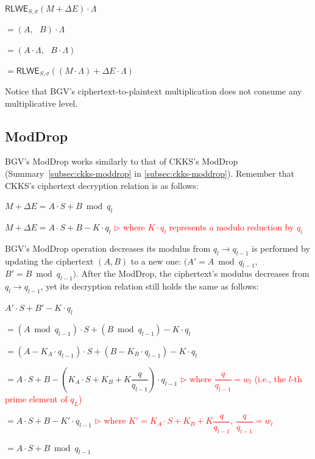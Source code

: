 \begin{tcolorbox}[title={\textbf{\tboxlabel{\ref*{subsec:bgv-mult-plain}} BGV Ciphertext-to-Plaintext Multiplication}}]
$\textsf{RLWE}_{S, \sigma}(M + \Delta E) \cdot \Lambda$

$= (A, \text{ } B) \cdot \Lambda$

$= (A \cdot \Lambda, \text{ }  B \cdot \Lambda )$

$= \textsf{RLWE}_{S, \sigma}((M \cdot \Lambda) + \Delta E\cdot \Lambda )$
\end{tcolorbox}

Notice that BGV's ciphertext-to-plaintext multiplication does not consume any multiplicative level. 

\subsection{\textsf{ModDrop}}
\label{subsec:bgv-moddrop}

BGV's \textsf{ModDrop} works similarly to that of CKKS's \textsf{ModDrop} (Summary~\ref*{subsec:ckks-moddrop} in \autoref{subsec:ckks-moddrop}). Remember that CKKS's ciphertext decryption relation is as follows:

$M + \Delta E = A \cdot S + B \bmod q_l$

$M + \Delta E = A \cdot S + B - K\cdot q_l$ \textcolor{red}{ $\rhd$ where $K\cdot q_l$ represents a modulo reduction by $q_l$}

BGV's \textsf{ModDrop} operation decreases its modulus from $q_l \rightarrow q_{l-1}$ is performed by updating the ciphertext $(A, B)$ to a new one: $\bm(A' = A \bmod q_{l-1}$, $B' = B \bmod q_{l-1})$. After the \textsf{ModDrop}, the ciphertext's modulus decreases from $q_l \rightarrow q_{l-1}$, yet its decryption relation still holds the same as follows:

$A' \cdot S + B' - K\cdot q_l $

$= (A \bmod q_{l-1}) \cdot S + (B \bmod q_{l-1}) - K\cdot q_l$

$= (A - K_A\cdot q_{l-1}) \cdot S + (B - K_B\cdot q_{l-1}) - K\cdot q_l$ 

$= A\cdot S + B - (K_A \cdot S + K_B + K\dfrac{q}{q_{l-1}})\cdot q_{l-1}$
\textcolor{red}{ $\rhd$ where $\dfrac{q}{q_{l-1}} = w_l$ (i.e., the $l$-th prime element of $q_L$)}

$= A\cdot S + B - K'\cdot q_{l-1}$ \textcolor{red}{ $\rhd$ where $K' = K_A\cdot S + K_B + K\dfrac{q}{q_{l-1}}$, $\dfrac{q}{q_{l-1}} = w_l$ }

$= A\cdot S + B \bmod q_{l-1}$

